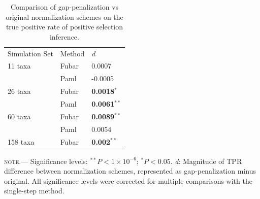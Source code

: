 \documentclass[10pt]{article}
\begin{document}
\begin{table}[H]
\label{tab:penalmodel}
\caption {Comparison of gap-penalization vs original normalization schemes on the true positive rate of positive selection inference.}
\begin{tabular}{l l l}
\hline\noalign{\smallskip}
Simulation Set & Method & \textit{d} \\
\noalign{\smallskip}\hline\noalign{\smallskip}
11 taxa  & Fubar & 0.0007 \\
              & Paml & -0.0005\\
\hline
26 taxa   & Fubar & \textbf{0.0018}$^{\ast}$\\
              & Paml & \textbf{0.0061}$^{\ast\ast}$\\
\hline
60 taxa  & Fubar & \textbf{0.0089}$^{\ast\ast}$ \\
              & Paml & 0.0054  \\
\hline
158 taxa & Fubar & \textbf{0.002}$^{\ast\ast}$  \\
\hline
\end{tabular}
\newline
\textsc{note.}--- Significance levels: $^{\ast\ast} P < 1\times10^{-6}$; $^{\ast} P < 0.05$. \textit{d}: Magnitude of TPR difference between normalization schemes, represented as gap-penalization minus original. All significance levels were corrected for multiple comparisons with the single-step method.
\end{table}






	
\end{document}
